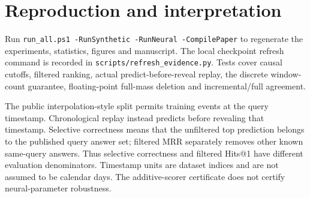 \documentclass[preprint,12pt]{elsarticle}
\begin{document}
\begin{table}[htbp]
\centering
\caption{Exactly equal accepted-count comparison, calibration seed 0. Both frozen score orderings accept the same number of test queries. Coverage budgets (20\%, 40\%) are prespecified; ties retain fixed source order. Intervals use 1,000 paired timestamp-block resamples and recompute each ordering at that budget. This evaluates a fixed budget, separately from the deployable validation-threshold policy.}
\small
{}
\end{table}
\clearpage
\section*{Reproduction and interpretation}
Run \texttt{run\_all.ps1 -RunSynthetic -RunNeural -CompilePaper} to regenerate the experiments, statistics, figures and manuscript. The local checkpoint refresh command is recorded in \texttt{scripts/refresh\_evidence.py}. Tests cover causal cutoffs, filtered ranking, actual predict-before-reveal replay, the discrete window-count guarantee, floating-point full-mass deletion and incremental/full agreement.

The public interpolation-style split permits training events at the query timestamp. Chronological replay instead predicts before revealing that timestamp. Selective correctness means that the unfiltered top prediction belongs to the published query answer set; filtered MRR separately removes other known same-query answers. Thus selective correctness and filtered Hits@1 have different evaluation denominators. Timestamp units are dataset indices and are not assumed to be calendar days. The additive-scorer certificate does not certify neural-parameter robustness.
\end{document}
